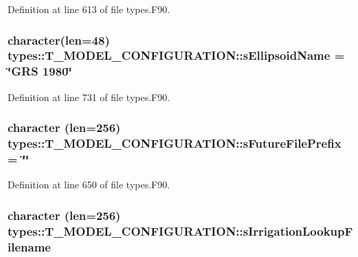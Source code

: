 Definition at line 613 of file types.F90.

\hypertarget{typetypes_1_1_t___m_o_d_e_l___c_o_n_f_i_g_u_r_a_t_i_o_n_adebcd7cd85e7da34936ebaa90fcb0f2b}{
\subsubsection[{sEllipsoidName}]{\setlength{\rightskip}{0pt plus 5cm}character(len=48) {\bf types::T\_\-MODEL\_\-CONFIGURATION::sEllipsoidName} = \char`\"{}GRS 1980\char`\"{}}}
\label{typetypes_1_1_t___m_o_d_e_l___c_o_n_f_i_g_u_r_a_t_i_o_n_adebcd7cd85e7da34936ebaa90fcb0f2b}


Definition at line 731 of file types.F90.

\hypertarget{typetypes_1_1_t___m_o_d_e_l___c_o_n_f_i_g_u_r_a_t_i_o_n_a0c3965ad6d9a38fa8a987d718c8615cc}{
\subsubsection[{sFutureFilePrefix}]{\setlength{\rightskip}{0pt plus 5cm}character (len=256) {\bf types::T\_\-MODEL\_\-CONFIGURATION::sFutureFilePrefix} = \char`\"{}\char`\"{}}}
\label{typetypes_1_1_t___m_o_d_e_l___c_o_n_f_i_g_u_r_a_t_i_o_n_a0c3965ad6d9a38fa8a987d718c8615cc}


Definition at line 650 of file types.F90.

\hypertarget{typetypes_1_1_t___m_o_d_e_l___c_o_n_f_i_g_u_r_a_t_i_o_n_a2bab72367e4cf1e97d0715a0903366e6}{
\subsubsection[{sIrrigationLookupFilename}]{\setlength{\rightskip}{0pt plus 5cm}character (len=256) {\bf types::T\_\-MODEL\_\-CONFIGURATION::sIrrigationLookupFilename}}}
\label{typetypes_1_1_t___m_o_d_e_l___c_o_n_f_i_g_u_r_a_t_i_o_n_a2bab72367e4cf1e97d0715a0903366e6}


